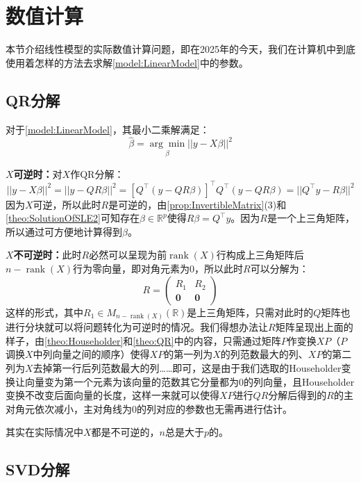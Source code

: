 \section{数值计算}

本节介绍线性模型的实际数值计算问题，即在2025年的今天，我们在计算机中到底使用着怎样的方法去求解\cref{model:LinearModel}中的参数。

\subsection{QR分解}
对于\cref{model:LinearModel}，其最小二乘解满足：
\begin{equation*}
	\hat{\beta}=\underset{\beta}{\arg\min}||y-X\beta||^2
\end{equation*}\par
\textbf{$X$可逆时：}对$X$作QR分解：
\begin{equation*}
	||y-X\beta||^2=||y-QR\beta||^2=[Q^{\top}(y-QR\beta)]^{\top}Q^{\top}(y-QR\beta)=||Q^{\top}y-R\beta||^2
\end{equation*}
因为$X$可逆，所以此时$R$是可逆的，由\cref{prop:InvertibleMatrix}(3)和\cref{theo:SolutionOfSLE2}可知存在$\beta\in\mathbb{R}^{p}$使得$R\beta=Q^{\top}y$。因为$R$是一个上三角矩阵，所以通过可方便地计算得到$\beta$。\par
\textbf{$X$不可逆时：}此时$R$必然可以呈现为前$\operatorname{rank}(X)$行构成上三角矩阵后$n-\operatorname{rank}(X)$行为零向量，即对角元素为$0$，所以此时$R$可以分解为：
\begin{equation*}
	R=
	\begin{pmatrix}
		R_1 & R_2 \\
		\mathbf{0} & \mathbf{0}
	\end{pmatrix}
\end{equation*}
这样的形式，其中$R_1\in M_{n-\operatorname{rank}(X)}(\mathbb{R})$是上三角矩阵，只需对此时的$Q$矩阵也进行分块就可以将问题转化为可逆时的情况。我们得想办法让$R$矩阵呈现出上面的样子，由\cref{theo:Householder}和\cref{theo:QR}中的内容，只需通过矩阵$P$作变换$XP$（$P$调换$X$中列向量之间的顺序）使得$XP$的第一列为$X$的列范数最大的列、$XP$的第二列为$X$去掉第一行后列范数最大的列……即可，这是由于我们选取的Householder变换让向量变为第一个元素为该向量的范数其它分量都为$0$的列向量，且Householder变换不改变后面向量的长度，这样一来就可以使得$XP$进行$QR$分解后得到的$R$的主对角元依次减小，主对角线为$0$的列对应的参数也无需再进行估计。\par
\begin{note}
	其实在实际情况中$X$都是不可逆的，$n$总是大于$p$的。
\end{note}

\subsection{SVD分解}